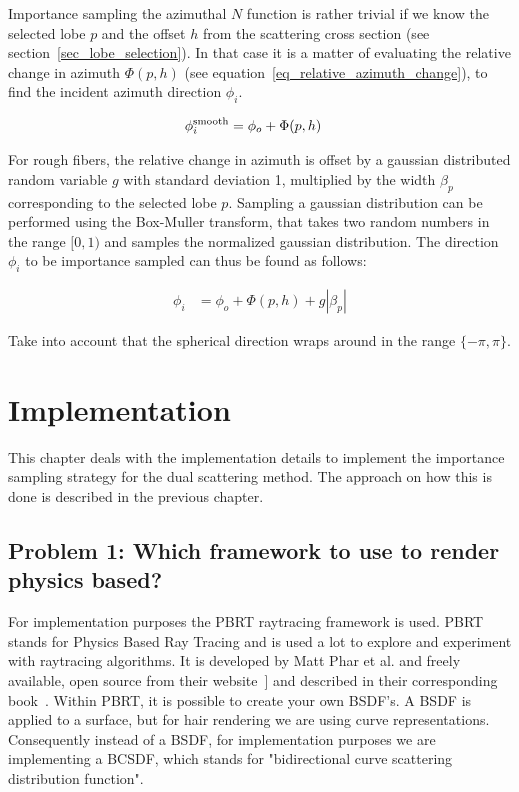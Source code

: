 \documentclass[11pt,a4paper]{report}
\begin{document}
Importance sampling the azimuthal $N$ function is rather trivial if we know the selected lobe $p$ and the offset $h$ from the scattering cross section (see section~\ref{sec_lobe_selection}). In that case it is a matter of evaluating the relative change in azimuth $\Phi(p, h)$ (see equation~\ref{eq_relative_azimuth_change}), to find the incident azimuth direction $\phi_i$.

\begin{align}
\label{phi_func}
\phi_i^{\textnormal{smooth}} &= \phi_o + \Phi(p, h)
\end{align}

For rough fibers, the relative change in azimuth is offset by a gaussian distributed random variable $g$ with standard deviation 1, multiplied by the width $\beta_p$ corresponding to the selected lobe $p$. Sampling a gaussian distribution can be performed using the Box-Muller transform, that takes two random numbers in the range $[0, 1)$ and samples the normalized gaussian distribution. The direction $\phi_i$ to be importance sampled can thus be found as follows:

\begin{align}
\phi_i &= \phi_o + \Phi(p, h) + g | \beta_p | 
\end{align}

Take into account that the spherical direction wraps around in the range $\{ -\pi, \pi \}$.


\chapter{Implementation}

This chapter deals with the implementation details to implement the importance sampling strategy for the dual scattering method. The approach on how this is done is described in the previous chapter. 


\section{Problem 1: Which framework to use to render physics based?}

For implementation purposes the PBRT raytracing framework is used. PBRT stands for Physics Based Ray Tracing and is used a lot to explore and experiment with raytracing algorithms. It is developed by Matt Phar et al. and freely available, open source from their website~] and described in their corresponding book~\cite{pbrt}. Within PBRT, it is possible to create your own BSDF's. A BSDF is applied to a surface, but for hair rendering we are using curve representations. Consequently instead of a BSDF, for implementation purposes we are implementing a BCSDF, which stands for "bidirectional curve scattering distribution function".
\end{document}
